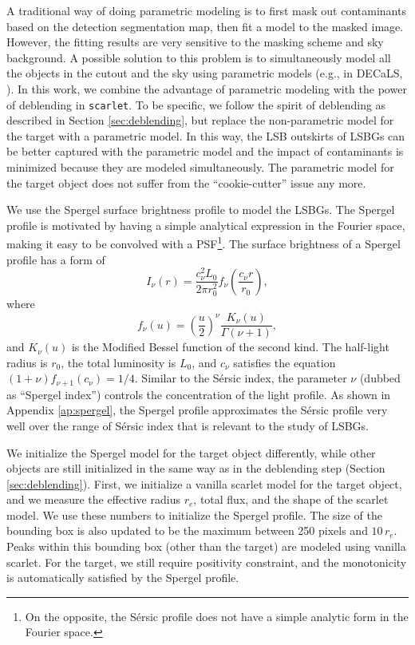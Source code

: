\documentclass[twocolumn,astrosymb,twocolappendix]{aastex631}
\newcommand{\code}[1]{\texttt{#1}}
\newcommand{\sersic}{S\'ersic}
\begin{document}
\begin{CJK*}{UTF8}{gbsn}
A traditional way of doing parametric modeling is to first mask out contaminants based on the detection segmentation map, then fit a model to the masked image. However, the fitting results are very sensitive to the masking scheme \citep[e.g.,][]{Greco2018} and sky background. A possible solution to this problem is to simultaneously model all the objects in the cutout and the sky using parametric models (e.g., in DECaLS, \citealt{Dey2019}). In this work, we combine the advantage of parametric modeling with the power of deblending in \code{scarlet}. To be specific, we follow the spirit of deblending as described in Section \ref{sec:deblending}, but replace the non-parametric model for the target with a parametric model. In this way, the LSB outskirts of LSBGs can be better captured with the parametric model and the impact of contaminants is minimized because they are modeled simultaneously. The parametric model for the target object does not suffer from the ``cookie-cutter'' issue any more. 

We use the Spergel surface brightness profile \citep{Spergel2010} to model the LSBGs. The Spergel profile is motivated by having a simple analytical expression in the Fourier space, making it easy to be convolved with a PSF\footnote{On the opposite, the \sersic{} profile does not have a simple analytic form in the Fourier space.}. The surface brightness of a Spergel profile has a form of
\begin{equation}
    \label{eq:spergel}
    I_\nu(r) = \frac{c_{\nu}^{2} L_{0}}{2\pi r_{0}^{2}} f_{\nu}\left(\frac{c_{\nu} r}{r_{0}}\right),
\end{equation}
where 
\begin{equation}
    f_{\nu}(u)=\left(\frac{u}{2}\right)^{\nu} \frac{K_{\nu}(u)}{\Gamma(\nu+1)},
\end{equation}
and $K_\nu(u)$ is the Modified Bessel function of the second kind. The half-light radius is $r_0$, the total luminosity is $L_0$, and $c_\nu$ satisfies the equation $(1 + \nu)f_{\nu + 1}(c_\nu) = 1/4$. Similar to the \sersic{} index, the parameter $\nu$ (dubbed as ``Spergel index'') controls the concentration of the light profile. As shown in Appendix \ref{ap:spergel}, the Spergel profile approximates the \sersic{} profile very well over the range of \sersic{} index that is relevant to the study of LSBGs.

We initialize the Spergel model for the target object differently, while other objects are still initialized in the same way as in the deblending step (Section \ref{sec:deblending}). First, we initialize a vanilla scarlet model for the target object, and we measure the effective radius $r_e$, total flux, and the shape of the scarlet model. We use these numbers to initialize the Spergel profile. The size of the bounding box is also updated to be the maximum between 250 pixels and $10\, r_e$. Peaks within this bounding box (other than the target) are modeled using vanilla scarlet. For the target, we still require positivity constraint, and the monotonicity is automatically satisfied by the Spergel profile. 


\end{CJK*}
\end{document}
